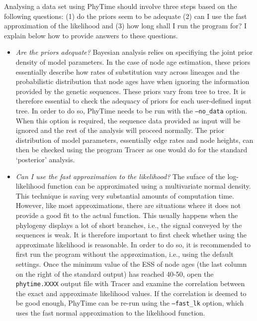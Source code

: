 \documentclass[a4paper,12pt]{article}
\newcommand{\x}[1]{\texttt{#1}}
\begin{document}
Analysing a data set using PhyTime should  involve three steps based on the following questions: (1)
do the priors seem to be adequate (2) can I use the fast approximation of the likelihood and (3) how
long shall I run the program for? I explain below how to provide answers to these questions.

\begin{itemize}
\item {\em  Are the priors adequate?} Bayesian  analysis relies on  specifiying the joint
prior density  of model parameters.  In  the case of  node age estimation, these  priors essentially
describe how rates of substitution vary across lineages and the probabilistic distribution that node
ages have when  ignoring the information provided  by the genetic sequences. These  priors vary from
tree to tree. It is therefore essential to  check the adequacy of priors for each user-defined input
tree. In order to do so, PhyTime needs to be run with the \x{--no\_data} option. When this option is
required, the  sequence data provided  as input will  be ignored and the  rest of the  analysis will
proceed  normally. The  prior distribution  of  model parameters,  essentially edge  rates and  node
heights, can then be  checked using the program Tracer as one would  do for the standard `posterior'
analysis.

\item {\em  Can I use the  fast approximation to the  likelihood?} The suface  of the log-likelihood
function can  be approximated using  a multivariate normal  density.  This technique is  saving very
substantial amounts  of computation  time. However, like  most approximations, there  are situations
where it does not provide a good fit to the actual function. This usually happens when the phylogeny
displays  a lot  of short  branches, i.e.,  the  signal conveyed  by the  sequences is  weak. It  is
therefore important to first check whether  using the approximate likelihood is reasonable. In order
to do  so, it is  recommended to first  run the program without  the approximation, i.e.,  using the
default settings. Once  the minimum value of the ESS  of node ages (the last column  on the right of
the  standard output)  has reached  40-50, open  the \x{phytime.XXXX}  output file  with  Tracer and
examine the correlation  between the exact and approximate likelihood values.  If the correlation is
deemed to be good enough, PhyTime can be re-run using the \x{--fast\_lk} option, which uses the fast
normal approximation to the likelihood function.




\end{itemize}
\end{document}
